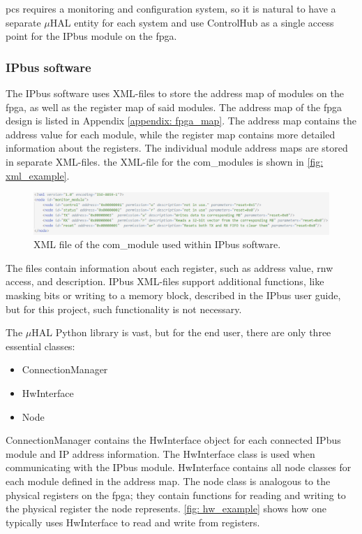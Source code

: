 \documentclass[main.tex]{subfiles}
\begin{document}
\gls{pcs} requires a monitoring and configuration system, so it is natural to have a separate $\mu$HAL entity for each system and use ControlHub as a single access point for the IPbus module on the \gls{fpga}.

\subsubsection{IPbus software}

The IPbus software uses XML-files to store the address map of modules on the \gls{fpga}, as well as the register map of said modules. The address map of the \gls{fpga} design is listed in Appendix \ref{appendix: fpga_map}. The address map contains the address value for each module, while the register map contains more detailed information about the registers. The individual module address maps are stored in separate XML-files. the XML-file for the com\_modules is shown in \autoref{fig: xml_example}.

\begin{figure}[!htpb]
    \centering
    \includegraphics[scale=0.65, width = 15cm]{images/com_module_xml.png}
    \caption{XML file of the com\_module used within IPbus software.}
    \label{fig: xml_example}
\end{figure}
\FloatBarrier

The files contain information about each register, such as address value, \gls{rnw} access, and description. IPbus XML-files support additional functions, like masking bits or writing to a memory block, described in the IPbus user guide\cite{ipbus_guide}, but for this project, such functionality is not necessary.

The $\mu$HAL Python library is vast, but for the end user, there are only three essential classes:

\begin{itemize}
    \item ConnectionManager
    \item HwInterface
    \item Node
\end{itemize}

ConnectionManager contains the HwInterface object for each connected IPbus module and IP address information. The HwInterface class is used when communicating with the IPbus module. HwInterface contains all node classes for each module defined in the address map. The node class is analogous to the physical registers on the \gls{fpga}; they contain functions for reading and writing to the physical register the node represents. \autoref{fig: hw_example} shows how one typically uses HwInterface to read and write from registers.
\end{document}
